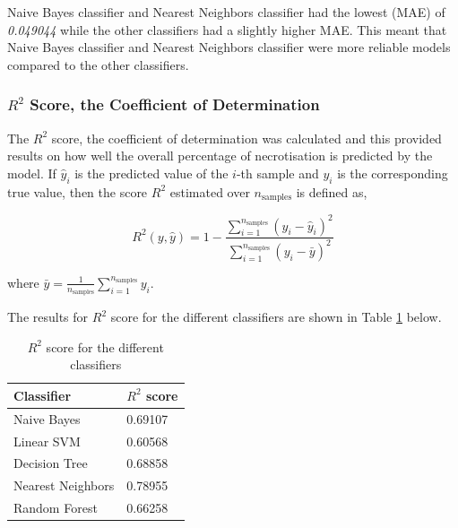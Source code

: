 \documentclass[conference]{IEEEtran}
\begin{document}
\noindent Naive Bayes classifier and Nearest Neighbors classifier had the lowest (MAE) of \emph{0.049044} while the other classifiers had a slightly higher MAE. This meant that Naive Bayes classifier and Nearest Neighbors classifier were more reliable models compared to the other classifiers.

\subsubsection{$R^{2}$ Score, the Coefficient of Determination}

The $R^{2}$ score, the coefficient of determination was calculated and this provided results on how well the overall percentage of necrotisation is predicted by the model. If $\hat{y}_{i}$ is the predicted value of the $i$-th sample and $y_{i}$ is the corresponding true value, then the score $R^{2}$ estimated over $n_{\text{samples}}$ is defined as,

\begin{equation}\label{eqn9}
    R^2(y, \hat{y}) = 1 - \frac{\sum_{i=1}^{n_{\text{samples}}} (y_{i} - \hat{y}_{i})^{2}}{\sum_{i=1}^{n_\text{samples}} (y_{i} - \bar{y})^{2}}
\end{equation}

\noindent where $\bar{y} =  \frac{1}{n_{\text{samples}}} \sum_{i=1}^{n_{\text{samples}}} y_{i}$.

\noindent The results for $R^{2}$ score for the different classifiers are shown in Table \ref{tbl:r2} below.


\begin{table}[Htbp]
\renewcommand{\arraystretch}{1.3}
\caption{$R^{2}$ score for the different classifiers }\label{tbl:r2}
\centering
    \begin{tabular}{|l|l|}
    \hline
      Classifier & $R^{2}$ score   \\ \hline
      Naive Bayes &   0.69107  \\
      \hline
      Linear SVM &  0.60568 \\
      \hline
      Decision Tree & 0.68858   \\
      \hline
      Nearest Neighbors &  0.78955  \\
      \hline
      Random Forest & 0.66258   \\    \hline
    \end{tabular}

\end{table}
\end{document}
